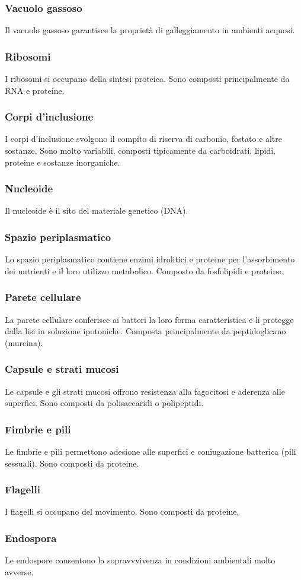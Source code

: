 \subsubsection{Vacuolo gassoso}
Il vacuolo gassoso garantisce la propriet\`a di galleggiamento in ambienti acquosi.
\subsubsection{Ribosomi}
I ribosomi si occupano della sintesi proteica. Sono composti principalmente da RNA e proteine.
\subsubsection{Corpi d'inclusione}
I corpi d'inclusione svolgono il compito di riserva di carbonio, fostato e altre sostanze. Sono molto variabili, composti tipicamente da carboidrati, 
lipidi, proteine e sostanze inorganiche.
\subsubsection{Nucleoide}
Il nucleoide \`e il sito del materiale genetico (DNA).
\subsubsection{Spazio periplasmatico}
Lo spazio periplasmatico contiene enzimi idrolitici e proteine per l'assorbimento dei nutrienti e il loro utilizzo metabolico. Composto da fosfolipidi e 
proteine. 
\subsubsection{Parete cellulare}
La parete cellulare conferisce ai batteri la loro forma caratteristica e li protegge dalla lisi in soluzione ipotoniche. Composta principalmente da 
peptidoglicano (mureina).
\subsubsection{Capsule e strati mucosi}
Le capsule e gli strati mucosi offrono resistenza alla fagocitosi e aderenza alle superfici. Sono composti da polisaccaridi o polipeptidi. 
\subsubsection{Fimbrie e pili}
Le fimbrie e pili permettono adesione alle superfici e coniugazione batterica (pili sessuali). Sono composti da proteine.
\subsubsection{Flagelli}
I flagelli si occupano del movimento. Sono composti da proteine.
\subsubsection{Endospora}
Le endospore consentono la sopravvvivenza in condizioni ambientali molto avverse. 